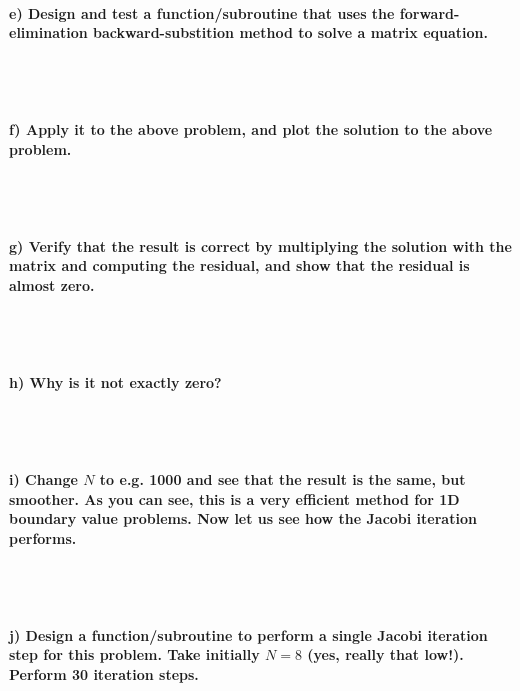 \paragraph{
    e) Design and test a function/subroutine that uses the 
    forward-elimination backward-substition method to solve a matrix 
    equation.
} \ \\
    \\

\paragraph{
    f) Apply it to the above problem, and plot the solution to the 
    above problem.
} \ \\
    \\

\paragraph{
    g) Verify that the result is correct by multiplying the solution 
    with the matrix and computing the residual, and show that the 
    residual is almost zero.
} \ \\
    \\

\paragraph{
    h) Why is it not exactly zero?
} \ \\
    \\

\paragraph{
    i) Change $N$ to e.g. 1000 and see that the result is the same, but 
    smoother. As you can see, this is a very efficient method for 1D 
    boundary value problems. Now let us see how the Jacobi iteration 
    performs.
} \ \\
    \\

\paragraph{
    j) Design a function/subroutine to perform a single Jacobi iteration 
    step for this problem. Take initially $N=8$ (yes, really that low!). 
    Perform 30 iteration steps.
} \ \\
    \\

